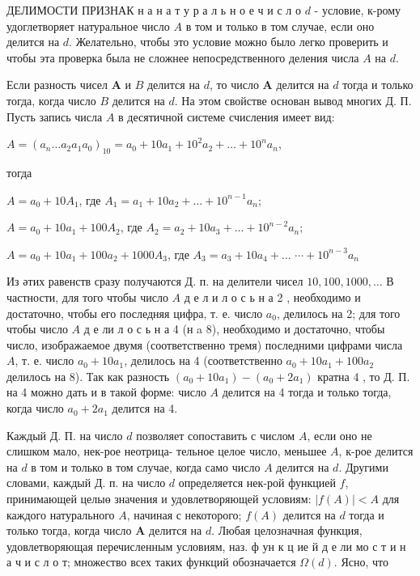 \documentclass[10pt]{article}
\begin{document}
ДЕЛИМОСТИ ПРИЗНАК н а н а т у р а л ь н о е ч и с л о $d$ - условие, к-рому удоглетворяет натуральное число $A$ в том и только в том случае, если оно делится на $d$. Желательно, чтобы это условие можно было легко проверить и чтобы эта проверка была не сложнее непосредственного деления числа $A$ на $d$.



Если разность чисел $\boldsymbol{A}$ и $B$ делится на $d$, то число $\boldsymbol{A}$ делится на $d$ тогда и только тогда, когда число $B$ делится на $d$. На этом свойстве основан вывод многих Д. П. Пусть запись числа $A$ в десятичной системе счисления имеет вид:



$A=\left(a_{n} \ldots a_{2} a_{1} a_{0}\right)_{10}=a_{0}+10 a_{1}+10^{2} a_{2}+\ldots+10^{n} a_{n}$,



тогда



$A=a_{0}+10 A_{1}$, где $A_{1}=a_{1}+10 a_{2}+\ldots+10^{n-1} a_{n}$;



$A=a_{0}+10 a_{1}+100 A_{2}$, где $A_{2}=a_{2}+10 a_{3}+\ldots+10^{n-2} a_{n}$;



$A=a_{0}+10 a_{1}+100 a_{2}+1000 A_{3}$, где $A_{3}=a_{3}+10 a_{4}+\ldots$ $\cdots+10^{n-3} a_{n}$



Из әтих равенств сразу получаются Д. п. на делители чисел $10,100,1000, \ldots$ В частности, для того чтобы число $A$ д е л и л о с ь н а 2 , необходимо и достаточно, чтобы его последняя цифра, т. е. число $a_{0}$, делилось на 2; для того чтобы число $A$ д е ли л о с ь н а 4 (н a 8), необходимо и достаточно, чтобы число, изображаемое двумя (соответственно тремя) последними цифрами числа $A$, т. е. число $a_{0}+10 a_{1}$, делилось на 4 (соответственно $a_{0}+10 a_{1}+100 a_{2}$ делилось на 8). Так как разность $\left(a_{0}+10 a_{1}\right)-\left(a_{0}+2 a_{1}\right)$ кратна 4 , то Д. П. на 4 можно дать и в такой форме: число $A$ делится на 4 тогда и только тогда, когда число $a_{0}+2 a_{1}$ делится на 4.



Каждый Д. П. на число $d$ позволяет сопоставить с числом $A$, если оно не слишком мало, нек-рое неотрица- тельное целое число, меньшее $A$, к-рое делится на $d$ в том и только в том случае, когда само число $A$ делится на $d$. Другими словами, каждый Д. п. на число $d$ определяется нек-рой функцией $f$, принимающей целыө значения и удовлетворяющей условиям: $|f(A)|<A$ для каждого натурального $A$, начиная с некоторого; $f(A)$ делится на $d$ тогда и только тогда, когда число $\boldsymbol{A}$ делится на $d$. Любая целозначная функция, удовлетворяющая перечисленным условиям, наз. ф ун к ц ие й д е ли мо с т и н а ч и с л $о$ т; множество всех таких функций обозначается $\Omega(d)$. Ясно, что
\end{document}
